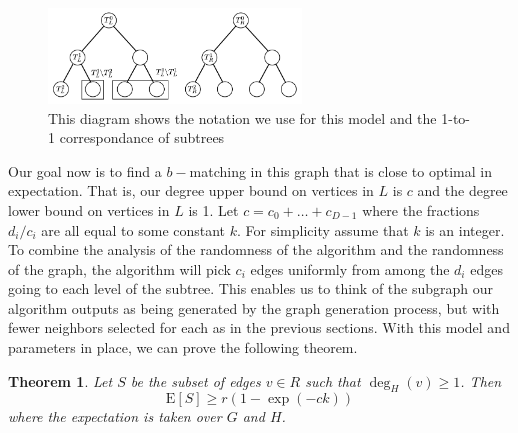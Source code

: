 \documentclass[11pt]{article}
\newcommand{\E}{\text{E}}
\newtheorem{thm}{Theorem}
\begin{document}
\begin{figure}[h]
\centering
\includegraphics[width=0.6\textwidth]{hierarchy_tree.png}
\begin{minipage}[h]{0.7\textwidth}
\caption{This diagram shows the notation we use for this model and the 1-to-1 correspondance of subtrees}
\end{minipage}
\end{figure}

Our goal now is to find a $b-$matching in this graph that is close to
optimal in expectation. That is, our degree upper bound on vertices in
$L$ is $c$ and the degree lower bound on vertices in $L$ is 1. Let $c
= c_0 + \ldots + c_{D-1}$ where the fractions $d_{i}/c_{i}$ are all
equal to some constant $k$. For simplicity assume that $k$ is an
integer. To combine the analysis of the randomness of the algorithm
and the randomness of the graph, the algorithm will pick $c_{i}$ edges
uniformly from among the $d_{i}$ edges going to each level of the
subtree. This enables us to think of the subgraph our algorithm
outputs as being generated by the graph generation process, but with
fewer neighbors selected for each as in the previous sections. With
this model and parameters in place, we can prove the following
theorem.\

\begin{thm}
Let $S$ be the subset of edges $v\in R$ such that $\deg_H(v) \geq 1$. Then
\[ \E[S] \geq r(1-\exp(-ck)) \]
where the expectation is taken over $G$ and $H$.
\end{thm}
\end{document}
